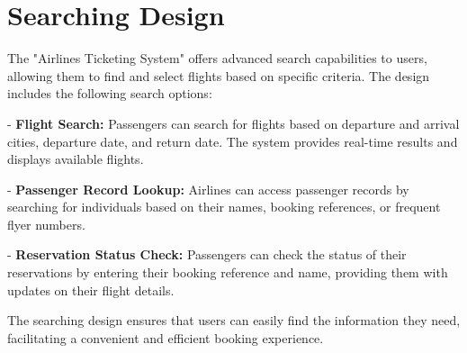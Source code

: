 \section{Searching Design}
The "Airlines Ticketing System" offers advanced search capabilities to users, allowing them to find and select flights based on specific criteria. The design includes the following search options:

- \textbf{Flight Search:} Passengers can search for flights based on departure and arrival cities, departure date, and return date. The system provides real-time results and displays available flights.

- \textbf{Passenger Record Lookup:} Airlines can access passenger records by searching for individuals based on their names, booking references, or frequent flyer numbers.

- \textbf{Reservation Status Check:} Passengers can check the status of their reservations by entering their booking reference and name, providing them with updates on their flight details.

The searching design ensures that users can easily find the information they need, facilitating a convenient and efficient booking experience.


\clearpage
